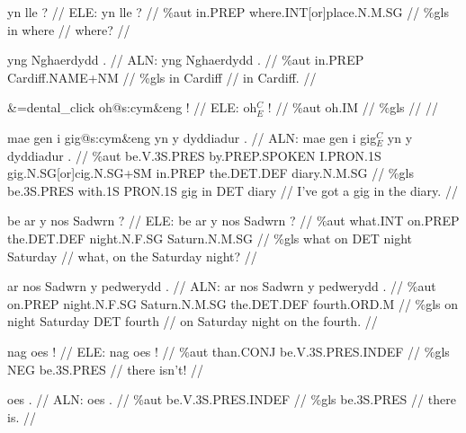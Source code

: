 \documentclass[a4paper,10pt]{article}
\begin{document}
\ex
\begingl[lingstyle=gergl]
\glchat yn lle ? //
\glsurface ELE:  yn lle ?  //
\glauto \%aut  in{\scriptsize .PREP} where{\scriptsize .INT[or]place.N.M.SG}   //
\glmanual \%gls  in where   //
\gleng where? //
\endgl
\xe

\ex
\begingl[lingstyle=gergl]
\glchat yng Nghaerdydd . //
\glsurface ALN:  yng Nghaerdydd .  //
\glauto \%aut  in{\scriptsize .PREP} Cardiff{\scriptsize .NAME+NM}   //
\glmanual \%gls  in Cardiff   //
\gleng in Cardiff. //
\endgl
\xe

\ex
\begingl[lingstyle=gergl]
\glchat \&=dental\_click oh@s:cym\&eng ! //
\glsurface ELE:  oh$^{C}_{E}$ !  //
\glauto \%aut  oh{\scriptsize .IM}   //
\glmanual \%gls     //
\gleng  //
\endgl
\xe

\ex
\begingl[lingstyle=gergl]
\glchat mae gen i gig@s:cym\&eng yn y dyddiadur . //
\glsurface ALN:  mae gen i gig$^{C}_{E}$ yn y dyddiadur .  //
\glauto \%aut  be{\scriptsize .V.3S.PRES} by{\scriptsize .PREP.SPOKEN} I{\scriptsize .PRON.1S} gig{\scriptsize .N.SG[or]cig.N.SG+SM} in{\scriptsize .PREP} the{\scriptsize .DET.DEF} diary{\scriptsize .N.M.SG}   //
\glmanual \%gls  be{\scriptsize .3S.PRES} with{\scriptsize .1S} PRON{\scriptsize .1S} gig in DET diary   //
\gleng I've got a gig in the diary. //
\endgl
\xe

\ex
\begingl[lingstyle=gergl]
\glchat be ar y nos Sadwrn ? //
\glsurface ELE:  be ar y nos Sadwrn ?  //
\glauto \%aut  what{\scriptsize .INT} on{\scriptsize .PREP} the{\scriptsize .DET.DEF} night{\scriptsize .N.F.SG} Saturn{\scriptsize .N.M.SG}   //
\glmanual \%gls  what on DET night Saturday   //
\gleng what, on the Saturday night? //
\endgl
\xe

\ex
\begingl[lingstyle=gergl]
\glchat ar nos Sadwrn y pedwerydd . //
\glsurface ALN:  ar nos Sadwrn y pedwerydd .  //
\glauto \%aut  on{\scriptsize .PREP} night{\scriptsize .N.F.SG} Saturn{\scriptsize .N.M.SG} the{\scriptsize .DET.DEF} fourth{\scriptsize .ORD.M}   //
\glmanual \%gls  on night Saturday DET fourth   //
\gleng on Saturday night on the fourth. //
\endgl
\xe

\ex
\begingl[lingstyle=gergl]
\glchat nag oes ! //
\glsurface ELE:  nag oes !  //
\glauto \%aut  than{\scriptsize .CONJ} be{\scriptsize .V.3S.PRES.INDEF}   //
\glmanual \%gls  NEG be{\scriptsize .3S.PRES}   //
\gleng there isn't! //
\endgl
\xe

\ex
\begingl[lingstyle=gergl]
\glchat oes . //
\glsurface ALN:  oes .  //
\glauto \%aut  be{\scriptsize .V.3S.PRES.INDEF}   //
\glmanual \%gls  be{\scriptsize .3S.PRES}   //
\gleng there is. //
\endgl
\xe
\end{document}

